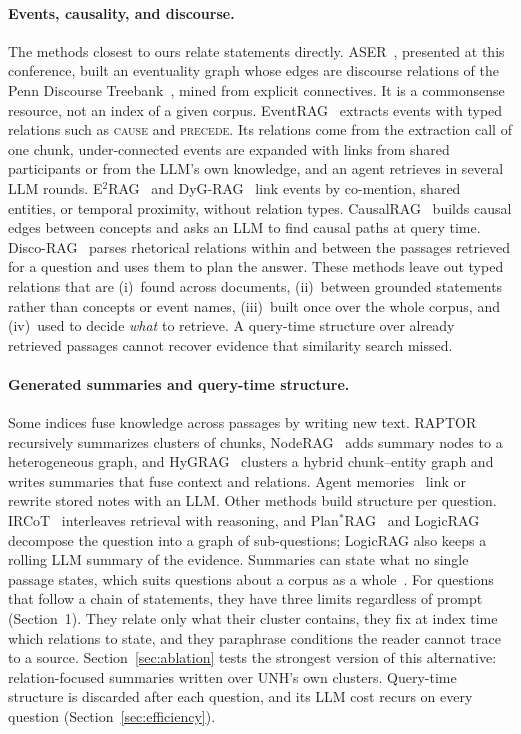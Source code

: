 \documentclass[sigconf, review, anonymous]{acmart}
\newcommand{\sys}{UNH}
\newcommand{\rel}[1]{\textsc{#1}}            %
\begin{document}
\paragraph{Events, causality, and discourse.}
The methods closest to ours relate statements directly. ASER~\cite{zhang2020aser}, presented at this conference, built an eventuality graph whose edges are discourse relations of the Penn Discourse Treebank~\cite{prasad2017penn}, mined from explicit connectives. It is a commonsense resource, not an index of a given corpus. EventRAG~\cite{yang2025eventrag} extracts events with typed relations such as \rel{cause} and \rel{precede}. Its relations come from the extraction call of one chunk, under-connected events are expanded with links from shared participants or from the LLM's own knowledge, and an agent retrieves in several LLM rounds. E$^2$RAG~\cite{zhang2026e2rag} and DyG-RAG~\cite{sun2025dygrag} link events by co-mention, shared entities, or temporal proximity, without relation types. CausalRAG~\cite{wang2025causalrag} builds causal edges between concepts and asks an LLM to find causal paths at query time. Disco-RAG~\cite{liu2026discorag} parses rhetorical relations within and between the passages retrieved for a question and uses them to plan the answer. These methods leave out typed relations that are (i)~found across documents, (ii)~between grounded statements rather than concepts or event names, (iii)~built once over the whole corpus, and (iv)~used to decide \emph{what} to retrieve. A query-time structure over already retrieved passages cannot recover evidence that similarity search missed.

\paragraph{Generated summaries and query-time structure.}
Some indices fuse knowledge across passages by writing new text. RAPTOR~\cite{sarthi2024raptor} recursively summarizes clusters of chunks, NodeRAG~\cite{xu2025noderag} adds summary nodes to a heterogeneous graph, and HyGRAG~\cite{zhong2026hygrag} clusters a hybrid chunk--entity graph and writes summaries that fuse context and relations. Agent memories~\cite{xu2025amem,qian2024memorag} link or rewrite stored notes with an LLM. Other methods build structure per question. IRCoT~\cite{trivedi2023interleaving} interleaves retrieval with reasoning, and Plan$^{*}$RAG~\cite{verma2025planrag} and LogicRAG~\cite{chen2026logicrag} decompose the question into a graph of sub-questions; LogicRAG also keeps a rolling LLM summary of the evidence. Summaries can state what no single passage states, which suits questions about a corpus as a whole~\cite{edge2024local}. For questions that follow a chain of statements, they have three limits regardless of prompt (Section~1). They relate only what their cluster contains, they fix at index time which relations to state, and they paraphrase conditions the reader cannot trace to a source. Section~\ref{sec:ablation} tests the strongest version of this alternative: relation-focused summaries written over \sys{}'s own clusters. Query-time structure is discarded after each question, and its LLM cost recurs on every question (Section~\ref{sec:efficiency}).
\end{document}
